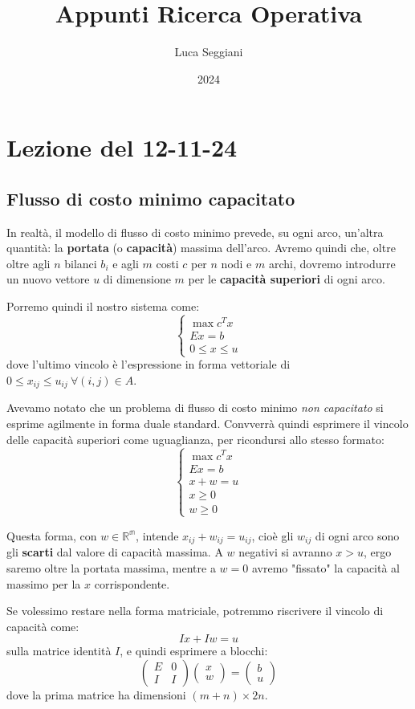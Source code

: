 \documentclass[a4paper,11pt]{article}
\title{Appunti Ricerca Operativa}
\author{Luca Seggiani}
\date{2024}
\begin{document}
\section{Lezione del 12-11-24}

\thispagestyle{empty}
\pagestyle{fancy}

\subsection{Flusso di costo minimo capacitato}
In realtà, il modello di flusso di costo minimo prevede, su ogni arco, un'altra quantità: la \textbf{portata} (o \textbf{capacità}) massima dell'arco.
Avremo quindi che, oltre oltre agli $n$ bilanci $b_i$ e agli $m$ costi $c$ per $n$ nodi e $m$ archi, dovremo introdurre un nuovo vettore $u$ di dimensione $m$ per le \textbf{capacità superiori} di ogni arco.

Porremo quindi il nostro sistema come:
\[
	\begin{cases}
		\max c^T x \\ 
		Ex = b \\ 
		0 \leq x \leq u
	\end{cases}
\]
dove l'ultimo vincolo è l'espressione in forma vettoriale di $0 \leq x_{ij} \leq u_{ij} \ \forall (i, j) \in A$.

Avevamo notato che un problema di flusso di costo minimo \textit{non capacitato} si esprime agilmente in forma duale standard. 
Convverrà quindi esprimere il vincolo delle capacità superiori come uguaglianza, per ricondursi allo stesso formato:
\[
	\begin{cases}
		\max c^T x \\ 
		Ex = b \\
		x + w = u \\ 
		x \geq 0 \\ 
		w \geq 0
	\end{cases}
\]

Questa forma, con $w \in \mathbb{R^m}$, intende $x_ {ij} + w_{ij} = u_{ij}$, cioè gli $w_{ij}$ di ogni arco sono gli \textbf{scarti} dal valore di capacità massima. A $w$ negativi si avranno $x > u$, ergo saremo oltre la portata massima, mentre a $w = 0$ avremo "fissato" la capacità al massimo per la $x$ corrispondente.

Se volessimo restare nella forma matriciale, potremmo riscrivere il vincolo di capacità come:
$$
Ix + Iw = u
$$
sulla matrice identità $I$, e quindi esprimere a blocchi:
$$
\begin{pmatrix}
	E & 0 \\ 
	I & I
\end{pmatrix}
\begin{pmatrix}
	x \\ w
\end{pmatrix}
=
\begin{pmatrix}
	b \\ u
\end{pmatrix}
$$
dove la prima matrice ha dimensioni $(m + n) \times 2n$.
\end{document}
